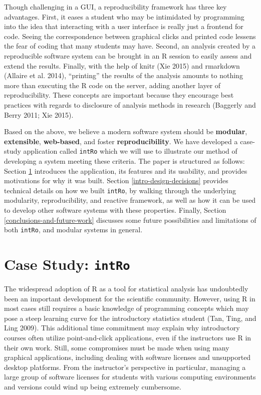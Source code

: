 \documentclass[12pt,]{article}
\begin{document}
Though challenging in a GUI, a reproducibility framework has three key
advantages. First, it eases a student who may be intimidated by
programming into the idea that interacting with a user interface is
really just a frontend for code. Seeing the correspondence between
graphical clicks and printed code lessens the fear of coding that many
students may have. Second, an analysis created by a reproducible
software system can be brought in an R session to easily assess and
extend the results. Finally, with the help of knitr (Xie 2015) and
rmarkdown (Allaire et al. 2014), ``printing'' the results of the
analysis amounts to nothing more than executing the R code on the
server, adding another layer of reproducibility. These concepts are
important because they encourage best practices with regards to
disclosure of analysis methods in research (Baggerly and Berry 2011; Xie
2015).

Based on the above, we believe a modern software system should be
\textbf{modular}, \textbf{extensible}, \textbf{web-based}, and foster
\textbf{reproducibility}. We have developed a case-study application
called \texttt{intRo} which we will use to illustrate our method of
developing a system meeting these criteria. The paper is structured as
follows: Section \ref{case-study-intro} introduces the application, its
features and its usability, and provides motivations for why it was
built. Section \ref{intro-design-decisions} provides technical details
on how we built \texttt{intRo}, by walking through the underlying
modularity, reproducibility, and reactive framework, as well as how it
can be used to develop other software systems with these properties.
Finally, Section \ref{conclusions-and-future-work} discusses some future
possibilities and limitations of both \texttt{intRo}, and modular
systems in general.

\section{\texorpdfstring{Case Study:
\texttt{intRo}}{Case Study: intRo}}\label{case-study-intro}

The widespread adoption of R as a tool for statistical analysis has
undoubtedly been an important development for the scientific community.
However, using R in most cases still requires a basic knowledge of
programming concepts which may pose a steep learning curve for the
introductory statistics student (Tan, Ting, and Ling 2009). This
additional time commitment may explain why introductory courses often
utilize point-and-click applications, even if the instructors use R in
their own work. Still, some compromises must be made when using many
graphical applications, including dealing with software licenses and
unsupported desktop platforms. From the instructor's perspective in
particular, managing a large group of software licenses for students
with various computing environments and versions could wind up being
extremely cumbersome.
\end{document}
